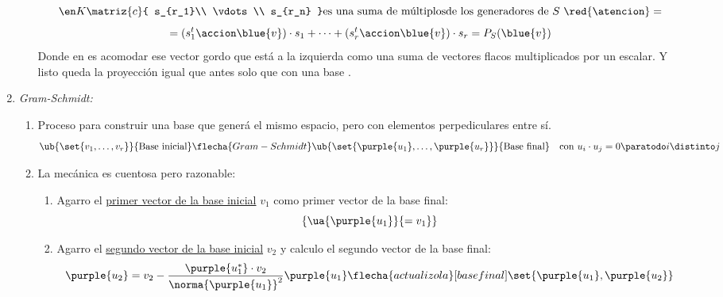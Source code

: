 \begin{enumerate}[label=\tiny\purple{\faIcon{snowman}}]
\begin{enumerate}[label=\poo]
$${{                    }{
                      \en K
                    }
                    \matriz{c}{
                      s_{r_1}\\
                      \vdots\\
                      s_{r_n}
                    }
                  }{
                    \text{es una suma de múltiplos}\\\text{de los generadores de } S \text{ \red{\atencion}}
                  }
                  =
                $$
                $$
                  = (s_1^t \accion \blue{v}) \cdot s_1 + \cdots +  (s_r^t \accion \blue{v}) \cdot s_r =
                  P_S(\blue{v})
                $$
                Donde en \red{!!} es acomodar ese vector gordo que está a la izquierda como una suma de vectores flacos multiplicados
                por un escalar. Y listo queda la proyección igual que antes solo que con una base .
        \end{enumerate}

  \item \textit{Gram-Schmidt:}
        \begin{enumerate}[label={\tiny\faIcon{pray}$_{\arabic*)}$}]
          \item Proceso para construir una base que generá el mismo espacio, pero con elementos perpediculares entre sí.
                $$
                  \ub{\set{v_1, \ldots, v_r}}{\text{Base inicial}}
                  \flecha{Gram-Schmidt}
                  \ub{\set{\purple{u_1}, \ldots, \purple{u_r}}}{\text{Base final}}
                  \quad \text{con } u_i \cdot u_j = 0 \paratodo i \distinto j
                $$

          \item La mecánica es cuentosa pero razonable:
                \begin{enumerate}[label=\arabic*)]
                  \item Agarro el \underline{primer vector de la base inicial} $v_1$ como primer vector de la base final:
                        $$
                          \{\ua{\purple{u_1}}{= v_1}\}
                        $$

                  \item Agarro el \underline{segundo vector de la base inicial} $v_2$ y calculo el segundo vector de la base final:
                        $$
                          \purple{u_2} = v_2 - \frac{\purple{u_1^*} \cdot v_2}{\norma{\purple{u_1}}^2}\purple{u_1}
                          \flecha{actualizo la}[base final]
                          \set{\purple{u_1}, \purple{u_2}}
                        $$


\end{enumerate}
\end{enumerate}
\end{enumerate}
